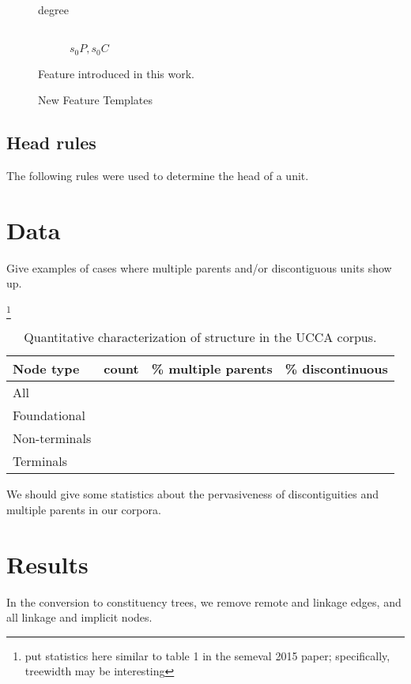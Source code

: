 \documentclass[11pt]{article}
\newcommand{\oa}[1]{\footnote{\color{red} #1}}
\begin{document}
\begin{figure}[t]
\begin{description}
	\item[degree] \hfill \\
	$s_0P, s_0C$
\end{description}
\caption{New Feature Templates}
\medskip
\small
Feature introduced in this work.
\label{fig:new_features}
\end{figure}

\subsection{Head rules}
\label{subsec:head_rules}

The following rules were used to determine the head of a unit.

\section{Data}\label{sec:data}

Give examples of cases where multiple parents and/or discontiguous units show up.

\oa{put statistics here similar to table 1 in the semeval 2015 paper; specifically, treewidth may be interesting}

\begin{table}[ht]
\begin{tabular}{lccc}
Node type & count & \% multiple parents & \% discontinuous \\
\hline
All &  & \\
Foundational &  & \\
Non-terminals &  & \\
Terminals &  &
\end{tabular}
\caption{Quantitative characterization of structure in the UCCA corpus. 
}
\end{table}

We should give some statistics about the pervasiveness of discontiguities and multiple parents in our corpora.

\section{Results}

In the conversion to constituency trees, we remove remote and linkage edges, and all linkage and implicit nodes.
\end{document}

